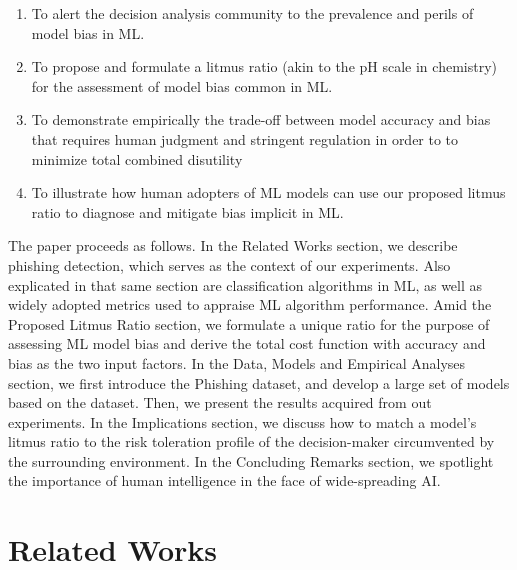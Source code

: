 \documentclass[]{interact}
\theoremstyle{plain}%
\theoremstyle{definition}
\theoremstyle{remark}
\begin{document}
\begin{enumerate}
	\item To alert the decision analysis  community to the prevalence and perils of model bias in ML.
	
	\item To propose and formulate a litmus ratio (akin to the pH scale in chemistry) for the assessment of model bias common in ML.
	\item To demonstrate empirically the trade-off between model accuracy and bias that  requires human judgment and stringent regulation in order to to minimize total combined  disutility
	\item To illustrate  how human adopters of ML models can use our proposed litmus ratio to diagnose and mitigate bias implicit in ML.
	
\end{enumerate}

The paper proceeds as follows. In the Related Works section, we describe phishing detection, which serves as the context of our experiments. Also explicated in that same section are classification algorithms in ML, as well as widely adopted metrics used to appraise ML algorithm performance. Amid the Proposed Litmus Ratio section, we formulate a unique ratio for the purpose of assessing ML model bias and derive the total cost function with accuracy and bias as the two input factors. In the Data, Models  and Empirical Analyses section, we first introduce the Phishing dataset, and develop a large set of models based on the dataset.  Then, we present the results acquired from out experiments. In the Implications section, we discuss how to match a model's litmus ratio to the risk toleration profile of the decision-maker circumvented by the surrounding environment. In the Concluding Remarks section, we spotlight the importance of human intelligence in the face of wide-spreading AI. 

\section{Related Works}
\end{document}
